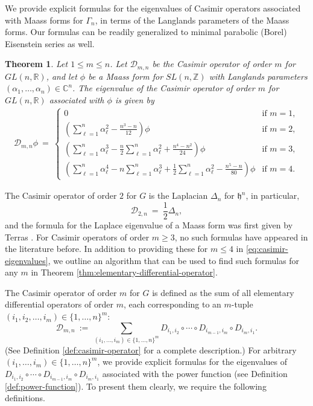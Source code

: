 \documentclass[12pt, reqno, oneside]{amsart}
\newtheorem{theorem}[corollary]{Theorem}
\numberwithin{equation}{section}
\begin{document}
We provide explicit formulas for the eigenvalues of Casimir operators associated with Maass forms for $\Gamma_n$, in terms of the Langlands parameters of the Maass forms. Our formulas can be readily generalized to minimal parabolic (Borel) Eisenstein series as well.

\begin{theorem}\label{thm:opening}
Let $1 \leq m \leq n$. Let $\mathcal{D}_{m,n}$ be the Casimir operator of order $m$ for $GL(n,\mathbb{R})$, and let $\phi$ be a Maass form for $SL(n,\mathbb{Z})$ with Langlands parameters $(\alpha_1, \dots, \alpha_n) \in \mathbb{C}^n$. The eigenvalue of the Casimir operator of order $m$ for $GL(n,\mathbb{R})$ associated with $\phi$ is given by
\begin{align}\label{eq:casimir-eigenvalues}
\mathcal{D}_{m,n} \phi \ = \ 
\begin{cases} 
0 & \text{if } m=1, \\
\left(\sum_{\ell=1}^n \alpha_\ell^2 - \frac{n^3-n}{12}\right)\phi & \text{if } m=2, \\
\left(\sum_{\ell=1}^n \alpha_\ell^3 - \frac{n}{2}\sum_{\ell=1}^n \alpha_\ell^2 + \frac{n^4-n^2}{24}\right)\phi & \text{if } m=3, \\
\left(\sum_{\ell=1}^n \alpha_\ell^4 - n \sum_{\ell=1}^n \alpha_\ell^3 + \frac{1}{2} \sum_{\ell=1}^n \alpha_\ell^2 - \frac{n^5-n}{80}\right)\phi & \text{if } m=4.
\end{cases}
\end{align}
\end{theorem}

The Casimir operator of order $2$ for $G$ is the Laplacian $\Delta_n$ for $\mathfrak{h}^n$, in particular,
\begin{equation}
\mathcal{D}_{2,n} \ = \ \frac{1}{2} \Delta_n,
\end{equation}
and the formula for the Laplace eigenvalue of a Maass form was first given by Terras \cite{Ter88}. For Casimir operators of order $m \geq 3$, no such formulas have appeared in the literature before. In addition to providing these for $m \leq 4$ in \eqref{eq:casimir-eigenvalues}, we outline an algorithm that can be used to find such formulas for any $m$ in Theorem \ref{thm:elementary-differential-operator}. 

The Casimir operator of order $m$ for $G$ is defined as the sum of all elementary differential operators of order $m$, each corresponding to an $m$-tuple $(i_1,i_2,\dots,i_m) \in \{1, \dots, n\}^m$:
\begin{equation}\label{eq:casimir-operator}
\mathcal{D}_{m,n} \ := \ \sum_{(i_1,\dots,i_m) \in \{1, \dots, n\}^m} D_{i_1,i_2} \circ \cdots \circ D_{i_{m-1},i_m} \circ D_{i_m,i_1}.    
\end{equation}
(See Definition \ref{def:casimir-operator} for a complete description.) For arbitrary $(i_1,\dots,i_m) \in \{1, \dots, n\}^m$, we provide explicit formulas for the eigenvalues of $D_{i_1,i_2} \circ \cdots \circ D_{i_{m-1},i_m} \circ D_{i_m,i_1}$ associated with the power function (see Definition \ref{def:power-function}). To present them clearly, we require the following definitions.
\end{document}
